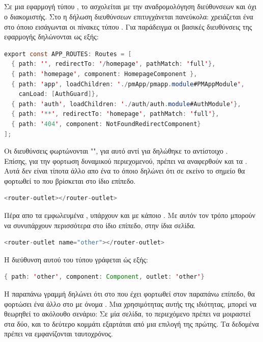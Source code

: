 \subsection*{}
\pSpace Σε μια εφαρμογή τύπου , το  ασχολείται με την αναδρομολόγηση διεύθυνσεων και όχι ο διακομιστής. Στο  η δήλωση διευθύνσεων επιτυγχάνεται πανεύκολα: χρειάζεται ένα  στο όποιο εισάγωνται οι πίνακες τύπου . Για παράδειγμα οι βασικές διευθύνσεις της εφαρμογής  δηλώνονται ως εξής:\\
	\begin{lstlisting}[language=Java]
export const APP_ROUTES: Routes = [
  { path: '', redirectTo: '/homepage', pathMatch: 'full'},
  { path: 'homepage', component: HomepageComponent },
  { path: 'app', loadChildren: './pmApp/pmapp.module#PMAppModule',
  	canLoad: [AuthGuard]},
  { path: 'auth', loadChildren: './auth/auth.module#AuthModule'},
  { path: '**', redirectTo: 'homepage', pathMatch: 'full'},
  { path: '404', component: NotFoundRedirectComponent}
];
	\end{lstlisting}
\pSpace Οι διευθύνσεις  φωρτώνονται "", για αυτό αντί για  δηλώθηκε το αντίστοιχο .\\
\pSpace Επίσης, για την φορτωση δυναμικού περιεχομενού, πρέπει να αναφερθούν και τα . Αυτά δεν είναι τίποτα άλλο απο ένα  το όποιο δηλώνει ότι σε εκείνο το σημείο θα φορτωθεί το  που βρίσκεται στο ίδιο επίπεδο.
	\begin{lstlisting}[language=Java]
	<router-outlet></router-outlet>
	\end{lstlisting}
\pSpace Πέρα απο τα εμφωλευμένα , υπάρχουν και  με κάποιο . Με αυτόν τον τρόπο μπορούν να συνυπάρχουν περισσότερα  στο ίδιο επίπεδο, στην ίδια σελίδα.
	\begin{lstlisting}[language=Java]
	<router-outlet name="other"></router-outlet>
	\end{lstlisting}
\pSpace Η διεύθυνση αυτού του τύπου  γράφεται ώς εξής:\\
	\begin{lstlisting}[language=Java]
{ path: 'other', component: Component, outlet: 'other'}
	\end{lstlisting}
\pSpace Η παραπάνω γραμμή δηλώνει ότι στο  που έχει φορτωθεί στον παραπάνω επίπεδο, θα φορτώσει ένα άλλο στο  με όνομα . Μια χρησιμότητας αυτής της ιδιότητας, μπορεί να θεωρηθεί το ακόλουθο σενάριο: Σε μία σελίδα, το περιεχόμενο πρέπει να μοιραστεί στα δύο, και το δεύτερο κομμάτι εξαρτάται από μια επιλογή της πρώτης. Τα δεδομένα πρέπει να εμφανίζονται ταυτοχρόνος.

